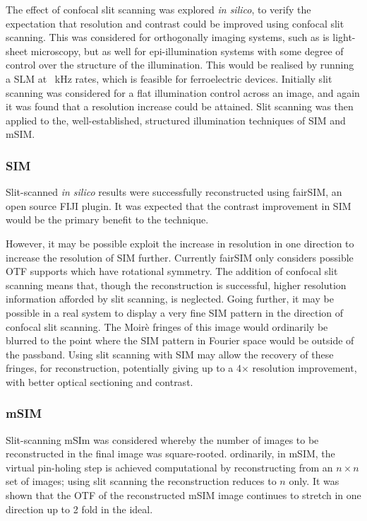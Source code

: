 The effect of confocal slit scanning was explored \emph{in silico}, to verify the expectation that resolution and contrast could be improved using confocal slit scanning.
This was considered for orthogonally imaging systems, such as is light-sheet microscopy, but as well for epi-illumination systems with some degree of control over the structure of the illumination.
This would be realised by running a SLM at \SI{}{\kilo\hertz} rates, which is feasible for ferroelectric devices.
Initially slit scanning was considered for a flat illumination control across an image, and again it was found that a resolution increase could be attained.
Slit scanning was then applied to the, well-established, structured illumination techniques of SIM and mSIM.

\subsubsection{SIM}

Slit-scanned \emph{in silico} results were successfully reconstructed using fairSIM, an open source FIJI plugin.
It was expected that the contrast improvement in SIM would be the primary benefit to the technique.

However, it may be possible exploit the increase in resolution in one direction to increase the resolution of SIM further.
Currently fairSIM only considers possible OTF supports which have rotational symmetry.
The addition of confocal slit scanning means that, though the reconstruction is successful, higher resolution information afforded by slit scanning, is neglected.
Going further, it may be possible in a real system to display a very fine SIM pattern in the direction of confocal slit scanning.
The Moirè fringes of this image would ordinarily be blurred to the point where the SIM pattern in Fourier space would be outside of the passband.
Using slit scanning with SIM may allow the recovery of these fringes, for reconstruction, potentially giving up to a 4$\times$ resolution improvement, with better optical sectioning and contrast.

\subsubsection{mSIM}

Slit-scanning mSIm was considered whereby the number of images to be reconstructed in the final image was square-rooted.
ordinarily, in mSIM, the virtual pin-holing step is achieved computational by reconstructing from an $n\times n$ set of images; using slit scanning the reconstruction reduces to $n$ only.
It was shown that the OTF of the reconstructed mSIM image continues to stretch in one direction up to 2 fold in the ideal.

